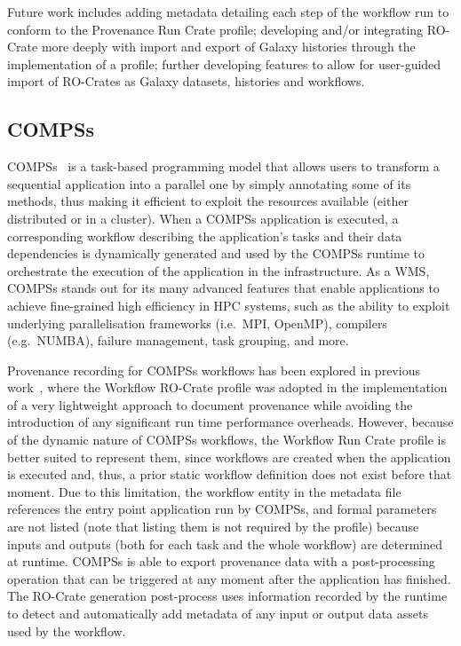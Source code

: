 \documentclass[10pt,letterpaper]{article}
\begin{document}
Future work includes adding metadata detailing each step of the workflow run to conform to the Provenance Run Crate profile; developing and/or integrating RO-Crate more deeply with import and export of Galaxy histories through the implementation of a profile; further developing features to allow for user-guided import of RO-Crates as Galaxy datasets, histories and workflows.

\subsection{COMPSs}\label{compss}

COMPSs~\cite{Lordan 2014} is a task-based programming model that allows users to transform a sequential application into a parallel one by simply annotating some of its methods, thus making it efficient to exploit the resources available (either distributed or in a cluster).
When a COMPSs application is executed, a corresponding workflow describing the application's tasks and their data dependencies is dynamically generated and used by the COMPSs runtime to orchestrate the execution of the application in the infrastructure.
As a WMS, COMPSs stands out for its many advanced features that enable applications to achieve fine-grained high efficiency in HPC systems, such as the ability to exploit underlying parallelisation frameworks (i.e.~MPI, OpenMP), compilers (e.g.~NUMBA), failure management, task grouping, and more.

Provenance recording for COMPSs workflows has been explored in previous work~\cite{Sirvent 2022}, where the Workflow RO-Crate profile was adopted in the implementation of a very lightweight approach to document provenance while avoiding the introduction of any significant run time performance overheads.
However, because of the dynamic nature of COMPSs workflows, the Workflow Run Crate profile is better suited to represent them, since workflows are created when the application is executed and, thus, a prior static workflow definition does not exist before that moment.
Due to this limitation, the workflow entity in the metadata file references the entry point application run by COMPSs, and formal parameters are not listed (note that listing them is not required by the profile) because inputs and outputs (both for each task and the whole workflow) are determined at runtime.
COMPSs is able to export provenance data with a post-processing operation that can be triggered at any moment after the application has finished.
The RO-Crate generation post-process uses information recorded by the runtime to detect and automatically add metadata of any input or output data assets used by the workflow.
\end{document}
